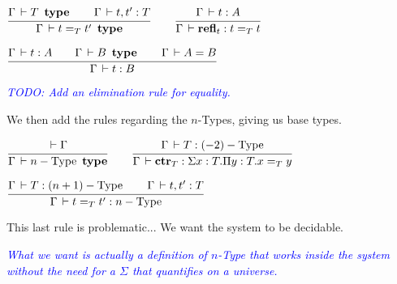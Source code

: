 \documentclass[a4paper,english]{lipics-utf8x}
\newcommand\meta[1]{\noindent\textcolor{blue}{\emph{#1}}}
\begin{document}
  \begin{center}
  \(
    \ru{\Gamma \der T \type \qquad
        \Gamma \der t,t' : T
      }{\Gamma \der t =_T t' \type}
    \qquad
    \ru{\Gamma \der t : A
      }{\Gamma \der \refl_t : t =_T t}
  \)
  \end{center}

  \begin{center}
  \(
    \ru{\Gamma \der t : A \qquad
        \Gamma \der B \type \qquad
        \Gamma \der A = B
      }{\Gamma \der t : B}
  \)
  \end{center}

  \meta{TODO: Add an elimination rule for equality.}

  \noindent %
  We then add the rules regarding the $n$-Types, giving us base
  types.

  \begin{center}
  \(
    \ru{\der \Gamma
      }{\Gamma \der n-\Type \type}
    \qquad
    \ru{\Gamma \der T : (-2)-\Type
      }{\Gamma \der \ctr_T : \Sigma x:T. \Pi y:T. x =_T y}
  \)
  \end{center}

  \begin{center}
  \(
    \ru{\Gamma \der T : (n+1)-\Type \qquad
        \Gamma \der t,t' : T
      }{\Gamma \der t =_T t' : n-\Type}
  \)
  \end{center}

  This last rule is problematic...
  We want the system to be decidable.

  \meta{What we want is actually a definition of $n$-Type that
  works inside the system without the need for a $\Sigma$
  that quantifies on a universe.}


%
%
\end{document}
